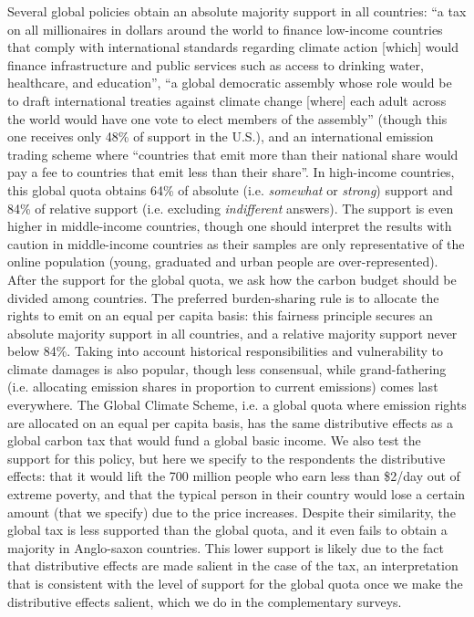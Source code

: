 Several global policies obtain an absolute majority %
support in all countries: ``a tax on all millionaires in dollars around the world to finance low-income countries that comply with international standards regarding climate action [which] would finance infrastructure and public services such as access to drinking water, healthcare, and education'', %
``a global democratic assembly whose role would be to draft international treaties against climate change [where] each adult across the world would have one vote to elect members of the assembly'' (though this one receives only 48\% of support in the U.S.), and an international emission trading scheme where ``countries that emit more than their national share would pay a fee to countries that emit less than their share''. 
In high-income countries, this global quota obtains 64\% of absolute (i.e. \textit{somewhat} or \textit{strong}) support and 84\% of relative support (i.e. excluding \textit{indifferent} answers). The support is even higher in middle-income countries, though one should interpret the results with caution in middle-income countries as their samples are only representative of the online population (young, graduated and urban people are over-represented). %
After the support for the global quota, we ask how the carbon budget should be divided among countries. 
The preferred burden-sharing rule is to allocate the rights to emit on an equal per capita basis: this fairness principle secures an absolute majority support in all countries, and a relative majority support never below 84\%. 
Taking into account historical responsibilities and vulnerability to climate damages is also popular, though less consensual, while grand-fathering (i.e. allocating emission shares in proportion to current emissions) comes last everywhere. 
The Global Climate Scheme, i.e. a global quota where emission rights are allocated on an equal per capita basis, has the same distributive effects as a global carbon tax that would fund a global basic income. We also test the support for this policy, but here we specify to the respondents the distributive effects: that it would lift the 700 million people who earn less than \$2/day out of extreme poverty, and that the typical person in their country would lose a certain amount (that we specify) due to the price increases.  %
Despite their similarity, the global tax is less supported than the global quota, and it even fails to obtain a majority in Anglo-saxon countries. This lower support is likely due to the fact that distributive effects are made salient in the case of the tax, an interpretation that is consistent with the level of support for the global quota once we make the distributive effects salient, which we do in the complementary surveys. %


